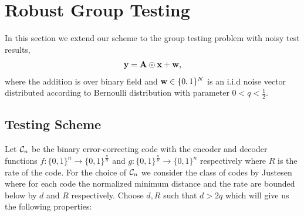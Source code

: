 \documentclass[conference,twocolumn]{IEEEtran}
\begin{document}
\section{Robust Group Testing}
\label{Sec:NoisyGroupTesting}
In this section we extend our scheme to the group testing problem with noisy test results,
\begin{align*}
\mathbf{y=A}\odot \mathbf{x+w},
\end{align*}
where the addition is over binary field and $\mathbf{w}\in\{0,1\}^N$ is an i.i.d noise vector distributed according to Bernoulli distribution with parameter $0<q<\frac{1}{2}$.

\subsection*{Testing Scheme}
Let $\mathcal{C}_n$ be the binary error-correcting code with the encoder and decoder functions $f:\{0,1\}^{n}\rightarrow \{0,1\}^{\frac{n}{R}}$ and $g:\{0,1\}^{\frac{n}{R}}\rightarrow \{0,1\}^{n}$ respectively where $R$ is the rate of the code.
For the choice of $\mathcal{C}_n$ we consider the class of codes by Justesen\cite{justesen1972class} where for each code the normalized minimum distance and the rate are bounded below by $d$ and $R$ respectively. Choose $d, R$ such that $d>2q$ which will give us the following properties:
\end{document}
